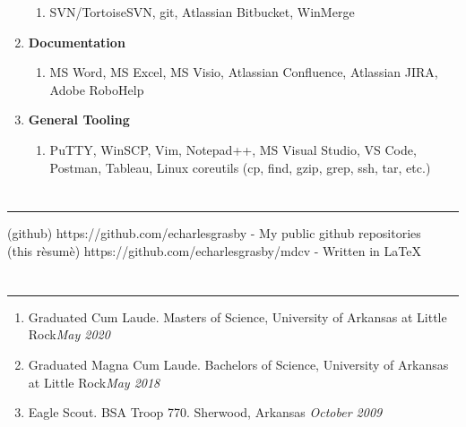 \documentclass[11pt]{article}
\newcommand{\ualr}{University of Arkansas at Little Rock}
\newcommand{\uppr}[3]{ \noindent\MakeUppercase{{\fontsize{#2}{#3} \selectfont {#1}}} }
\begin{document}
\begin{enumerate}[topsep=0pt, partopsep=0pt, label=\null]
\begin{enumerate}[topsep=0pt, partopsep=0pt, label=\null]
  \item SVN/TortoiseSVN, git, Atlassian Bitbucket, WinMerge
  \end{enumerate}
\item \textbf{Documentation}
  \begin{enumerate}[topsep=0pt, partopsep=0pt, label=\null]
  \item MS Word, MS Excel, MS Visio, Atlassian Confluence, Atlassian JIRA, Adobe RoboHelp
  \end{enumerate}
\item \textbf{General Tooling}
  \begin{enumerate}[topsep=0pt, partopsep=0pt, label=\null]
  \item PuTTY, WinSCP, Vim, Notepad++, MS Visual Studio, VS Code, Postman, Tableau, Linux coreutils (cp, find, gzip, grep, ssh, tar, etc.)
  \end{enumerate}

\end{enumerate}

\section*{\uppr{Projects}{14}{16}}\noindent \rule{1.0\textwidth}{0.4pt}
(github) https://github.com/echarlesgrasby - My public github repositories \\
(this r\`esum\`e) https://github.com/echarlesgrasby/mdcv - Written in {\LaTeX}
\section*{\uppr{Accolades}{14}{16}}\noindent \rule{1.0\textwidth}{0.4pt}
\setlength{\leftmargini}{0pt}
\begin{enumerate}[topsep=0pt, partopsep=0pt, label=\null]
\item Graduated Cum Laude. Masters of Science, \ualr \hfill \textit{May 2020}
\item Graduated Magna Cum Laude. Bachelors of Science, \ualr \hfill \textit{May 2018}
\item Eagle Scout. BSA Troop 770. Sherwood, Arkansas \hfill \textit{October 2009}
\end{enumerate}
\end{document}
